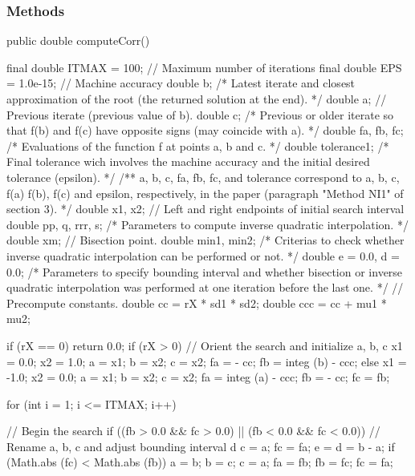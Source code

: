 \subsubsection* {Methods}
\begin{code}

   public double computeCorr()\begin{hide}
   {
      final double ITMAX = 100;   // Maximum number of iterations
      final double EPS = 1.0e-15; // Machine accuracy
      double b; /* Latest iterate and closest approximation of the root
      		     (the returned solution at the end). */
      double a; // Previous iterate (previous value of b).
      double c; /* Previous or older iterate so that f(b) and f(c)
      	             have opposite signs (may coincide with a). */
      double fa, fb, fc; /* Evaluations of the function f at points
      			      a, b and c. */
      double tolerance1; /* Final tolerance wich involves the machine
      			      accuracy and the initial desired tolerance
      			      (epsilon). */
      /** a, b, c, fa, fb, fc, and tolerance correspond to a, b, c, f(a)
          f(b), f(c) and epsilon, respectively, in the paper
          (paragraph "Method NI1" of section 3). */
      double x1, x2; // Left and right endpoints of initial search interval
      double pp, q, rrr, s; /* Parameters to compute inverse quadratic
      				 interpolation. */
      double xm; // Bisection point.
      double min1, min2; /* Criterias to check whether inverse quadratic
      			      interpolation can be performed or not. */
      double e = 0.0, d = 0.0; /* Parameters to specify bounding interval
      				    and whether bisection or inverse
      				    quadratic interpolation was performed
      				    at one iteration before the last one. */
      // Precompute constants.
      double cc = rX * sd1 * sd2;
      double ccc = cc + mu1 * mu2;

      if (rX == 0)
         return 0.0;
      if (rX > 0) {  // Orient the search and initialize a, b, c
         x1 = 0.0;
         x2 = 1.0;
         a = x1;
         b = x2;
         c = x2;
         fa = - cc;
         fb = integ (b) - ccc;
      } else {
         x1 = -1.0;
         x2 = 0.0;
         a = x1;
         b = x2;
         c = x2;
         fa = integ (a) - ccc;
         fb = - cc;
      }
      fc = fb;

      for (int i = 1; i <= ITMAX; i++) {   // Begin the search
         if ((fb > 0.0 && fc > 0.0) || (fb < 0.0 && fc < 0.0)) {
            // Rename a, b, c and adjust bounding interval d
            c = a;
            fc = fa;
            e = d = b - a;
         }
         if (Math.abs (fc) < Math.abs (fb)) {
            a = b;
            b = c;
            c = a;
            fa = fb;
            fb = fc;
            fc = fa;
         }

}}
\end{hide}
\end{code}
